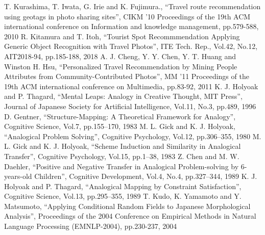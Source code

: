 \documentclass[journal]{IAENGtran}
\begin{document}
%
%
%
\begin{thebibliography}{1}
    T. Kurashima, T. Iwata, G. Irie and K. Fujimura.,
      ``Travel route recommendation using geotags in photo sharing sites'',
      CIKM '10 Proceedings of the 19th ACM international conference on Information and knowledge management, pp.579-588, 2010
    R. Kitamura and T. Itoh,
      ``Tourist Spot Recommmendation Applying Generic Object Recognition with Travel Photos'',
      ITE Tech. Rep., Vol.42, No.12, AIT2018-94, pp.185-188, 2018
    A. J. Cheng, Y. Y. Chen, Y. T. Huang and Winston H. Hsu,
      ``Personalized Travel Recommendation by Mining People Attributes from Community-Contributed Photos'',
      MM '11 Proceedings of the 19th ACM international conference on Multimedia, pp.83-92, 2011
    K. J. Holyoak and P. Thagard,
      ``Mental Leaps: Analogy in Creative Thought, MIT Press'',
      Journal of Japanese Society for Artificial Intelligence,  Vol.11, No.3,  pp.489, 1996
    D. Gentner,
      ``Structure-Mapping: A Theoretical Framework for Analogy'',
      Cognitive Science, Vol.7, pp.155–170, 1983
    M. L. Gick and K. J. Holyoak,
      ``Analogical Problem Solving'',
      Cognitive Psychology, Vol.12, pp.306–355, 1980
    M. L. Gick and K. J. Holyoak,
      ``Scheme Induction and Similarity in Analogical Transfer'',
      Cognitive Psychology, Vol.15, pp.1–38, 1983
    Z. Chen and M. W. Daehler,
      ``Positive and Negative Transfer in Analogical Problem-solving by 6-years-old Children'',
      Cognitive Development, Vol.4, No.4, pp.327–344, 1989
    K. J. Holyoak and P. Thagard,
      ``Analogical Mapping by Constraint Satisfaction'',
      Cognitive Science, Vol.13, pp.295–355, 1989
    T. Kudo, K. Yamamoto and Y. Matsumoto,
    ``Applying Conditional Random Fields to Japanese Morphological Analysis'',
    Proceedings of the 2004 Conference on Empirical Methods in Natural Language Processing (EMNLP-2004), pp.230-237, 2004

\end{thebibliography}
\end{document}
